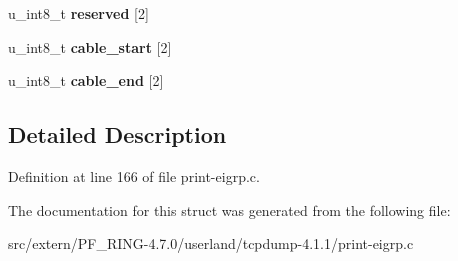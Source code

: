 \begin{DoxyCompactItemize}
\item 
\hypertarget{structeigrp__tlv__at__int__t_a159f8ef49216bbf1ed53bf84d8b4a9fa}{
u\_\-int8\_\-t {\bfseries reserved} \mbox{[}2\mbox{]}}
\label{structeigrp__tlv__at__int__t_a159f8ef49216bbf1ed53bf84d8b4a9fa}

\item 
\hypertarget{structeigrp__tlv__at__int__t_acd5de909ae039f1f70658514c4f2743c}{
u\_\-int8\_\-t {\bfseries cable\_\-start} \mbox{[}2\mbox{]}}
\label{structeigrp__tlv__at__int__t_acd5de909ae039f1f70658514c4f2743c}

\item 
\hypertarget{structeigrp__tlv__at__int__t_a0d48a7f4ee08b6549e1423dc5bb8ed47}{
u\_\-int8\_\-t {\bfseries cable\_\-end} \mbox{[}2\mbox{]}}
\label{structeigrp__tlv__at__int__t_a0d48a7f4ee08b6549e1423dc5bb8ed47}

\end{DoxyCompactItemize}


\subsection{Detailed Description}


Definition at line 166 of file print-\/eigrp.c.



The documentation for this struct was generated from the following file:\begin{DoxyCompactItemize}
\item 
src/extern/PF\_\-RING-\/4.7.0/userland/tcpdump-\/4.1.1/print-\/eigrp.c\end{DoxyCompactItemize}
